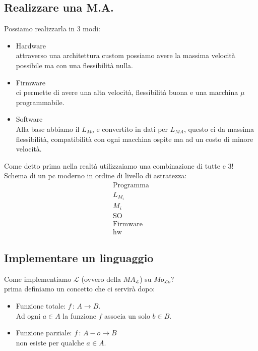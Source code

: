 \documentclass[a4paper,12pt]{article}
\begin{document}
\subsection*{Realizzare una M.A.}
Possiamo realizzarla in 3 modi:
\begin{itemize}
  \item Hardware \\
  attraverso una architettura custom possiamo avere la massima velocità possibile ma con una flessibilità nulla.
  \item Firmware \\
  ci permette di avere una alta velocità, flessibilità buona e una macchina $\mu$programmabile.
  \item Software \\
  Alla base abbiamo il $L_{Mo}$ e convertito in dati per $L_{MA}$, questo ci da massima flessibilità, compatibilità con ogni macchina ospite ma ad un costo di minore velocità.
\end{itemize}
Come detto prima nella realtà utilizzaiamo una combinazione di tutte e 3! \\
Schema di un pc moderno in ordine di livello di astratezza:
\begin{align*}
  \text{Programma} \\
  L_{M_{i}} \\
  M_i \\
  \text{SO} \\
  \text{Firmware} \\
  \text{hw}
\end{align*}
\subsection*{Implementare un linguaggio}
Come implementiamo $\mathcal{L}$ (ovvero della $MA_\mathcal{L}$) su $Mo_{\mathcal{L}o}$? \\
prima definiamo un concetto che ci servirà dopo:
\begin{itemize}
  \item Funzione totale: $f \,: \, A \to B$. \\
  Ad ogni $a \in A$ la funzione $f$ associa un solo $b \in B$.
  \item Funzione parziale: $f \,: \, A-o \to B$ \\
  non esiste per qualche $a \in A$.
\end{itemize}
\end{document}
